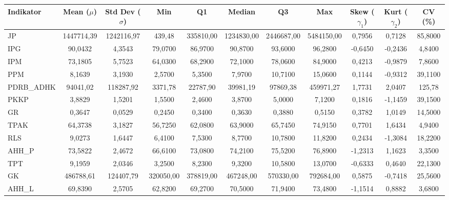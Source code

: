 \begin{adjustbox}{max width=\textwidth}
\small
\begin{tabular}{|>{\centering\arraybackslash}p{2.5cm}|c|c|c|c|c|c|c|c|c|c|}
\hline
\textbf{Indikator} & \textbf{Mean ($\mu$)} & \textbf{Std Dev ($\sigma$)} & \textbf{Min} & \textbf{Q1} & \textbf{Median} & \textbf{Q3} & \textbf{Max} & \textbf{Skew ($\gamma_1$)} & \textbf{Kurt ($\gamma_2$)} & \textbf{CV (\%)} \\
\hline
JP & 1447714,39 & 1242116,97 & 439,48 & 335810,00 & 1234830,00 & 2446687,00 & 5484150,00 & 0,7956 & 0,7128 & 85,8000 \\
IPG & 90,0432 & 4,3543 & 79,0700 & 86,9700 & 90,8700 & 93,6000 & 96,2800 & -0,6450 & -0,2436 & 4,8400 \\
IPM & 73,1805 & 5,7523 & 64,0300 & 68,2900 & 72,1000 & 78,0600 & 84,9000 & 0,4213 & -0,9879 & 7,8600 \\
PPM & 8,1639 & 3,1930 & 2,5700 & 5,3500 & 7,9700 & 10,7100 & 15,0600 & 0,1144 & -0,9312 & 39,1100 \\
PDRB\_ADHK & 94041,02 & 118287,92 & 3371,78 & 22787,90 & 39981,19 & 97869,38 & 459971,27 & 1,7731 & 2,0407 & 125,78 \\
PKKP & 3,8829 & 1,5201 & 1,5500 & 2,4600 & 3,8700 & 5,0000 & 7,1200 & 0,1816 & -1,1459 & 39,1500 \\
GR & 0,3647 & 0,0529 & 0,2450 & 0,3400 & 0,3630 & 0,3880 & 0,5150 & 0,3782 & 1,0149 & 14,5000 \\
TPAK & 64,3738 & 3,1827 & 56,7250 & 62,0800 & 63,9000 & 65,7450 & 74,9150 & 0,7701 & 1,6434 & 4,9400 \\
RLS & 9,0273 & 1,6447 & 6,4100 & 7,5300 & 8,7700 & 10,7800 & 11,8200 & 0,2434 & -1,3084 & 18,2200 \\
AHH\_P & 73,5822 & 2,4672 & 66,6100 & 73,0800 & 74,2100 & 75,5200 & 76,8900 & -1,2313 & 1,1623 & 3,3500 \\
TPT & 9,1959 & 2,0346 & 3,2500 & 8,2300 & 9,3200 & 10,5800 & 13,0700 & -0,6333 & 0,4640 & 22,1300 \\
GK & 486788,61 & 124407,79 & 320050,00 & 378819,00 & 467248,00 & 570330,00 & 792684,00 & 0,5875 & -0,7418 & 25,5600 \\
AHH\_L & 69,8390 & 2,5705 & 62,8200 & 69,2700 & 70,5000 & 71,9400 & 73,4800 & -1,1514 & 0,8882 & 3,6800 \\
\hline
\end{tabular}
\end{adjustbox}
